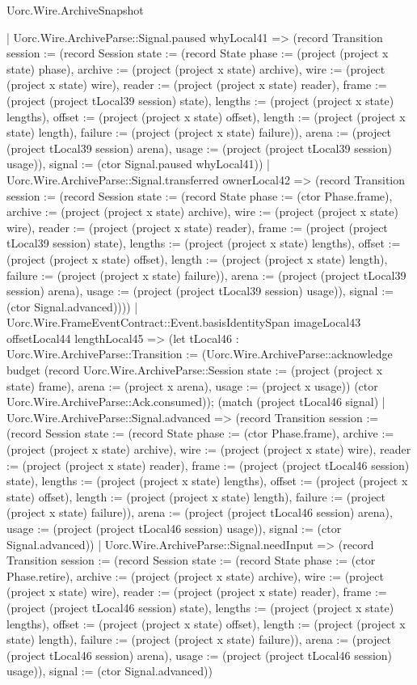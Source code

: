 \begin{lexlean}{Uorc.Wire.ArchiveSnapshot}
\begin{semanticmodule}
{        | Uorc.Wire.ArchiveParse::Signal.paused whyLocal41 => (record Transition {session := (record Session {state := (record State {phase := (project (project x state) phase), archive := (project (project x state) archive), wire := (project (project x state) wire), reader := (project (project x state) reader), frame := (project (project tLocal39 session) state), lengths := (project (project x state) lengths), offset := (project (project x state) offset), length := (project (project x state) length), failure := (project (project x state) failure)}), arena := (project (project tLocal39 session) arena), usage := (project (project tLocal39 session) usage)}), signal := (ctor Signal.paused whyLocal41)})
        | Uorc.Wire.ArchiveParse::Signal.transferred ownerLocal42 => (record Transition {session := (record Session {state := (record State {phase := (ctor Phase.frame), archive := (project (project x state) archive), wire := (project (project x state) wire), reader := (project (project x state) reader), frame := (project (project tLocal39 session) state), lengths := (project (project x state) lengths), offset := (project (project x state) offset), length := (project (project x state) length), failure := (project (project x state) failure)}), arena := (project (project tLocal39 session) arena), usage := (project (project tLocal39 session) usage)}), signal := (ctor Signal.advanced)})))
      | Uorc.Wire.FrameEventContract::Event.basisIdentitySpan imageLocal43 offsetLocal44 lengthLocal45 => (let tLocal46 : Uorc.Wire.ArchiveParse::Transition := (Uorc.Wire.ArchiveParse::acknowledge budget (record Uorc.Wire.ArchiveParse::Session {state := (project (project x state) frame), arena := (project x arena), usage := (project x usage)}) (ctor Uorc.Wire.ArchiveParse::Ack.consumed)); (match (project tLocal46 signal)
        | Uorc.Wire.ArchiveParse::Signal.advanced => (record Transition {session := (record Session {state := (record State {phase := (ctor Phase.frame), archive := (project (project x state) archive), wire := (project (project x state) wire), reader := (project (project x state) reader), frame := (project (project tLocal46 session) state), lengths := (project (project x state) lengths), offset := (project (project x state) offset), length := (project (project x state) length), failure := (project (project x state) failure)}), arena := (project (project tLocal46 session) arena), usage := (project (project tLocal46 session) usage)}), signal := (ctor Signal.advanced)})
        | Uorc.Wire.ArchiveParse::Signal.needInput => (record Transition {session := (record Session {state := (record State {phase := (ctor Phase.retire), archive := (project (project x state) archive), wire := (project (project x state) wire), reader := (project (project x state) reader), frame := (project (project tLocal46 session) state), lengths := (project (project x state) lengths), offset := (project (project x state) offset), length := (project (project x state) length), failure := (project (project x state) failure)}), arena := (project (project tLocal46 session) arena), usage := (project (project tLocal46 session) usage)}), signal := (ctor Signal.advanced)})
}
\end{semanticmodule}
\end{lexlean}
